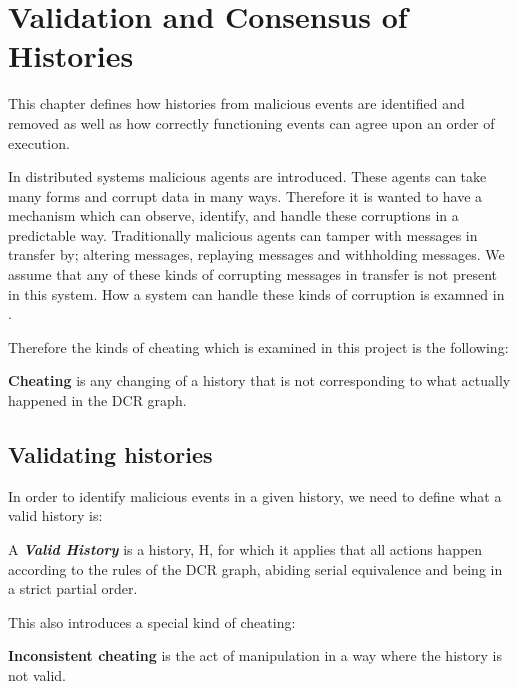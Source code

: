 \chapter{Validation and Consensus of Histories}
\label{chap:consensusindcr}
	This chapter defines how histories from malicious events are identified and removed as well as how correctly functioning events can agree upon an order of execution.
	
	\newpar In distributed systems malicious agents are introduced. These agents can take many forms and corrupt data in many ways. Therefore it is wanted to have a mechanism which can observe, identify, and handle these corruptions in a predictable way. Traditionally malicious agents can tamper with messages in transfer by; altering messages, replaying messages and withholding messages. We assume that any of these kinds of corrupting messages in transfer is not present in this system. How a system can handle these kinds of corruption is examned in .
	
	\newpar Therefore the kinds of cheating which is examined in this project is the following:
	\begin{definition}
		\textbf{Cheating} is any changing of a history that is not corresponding to what actually happened in the DCR graph.
	\end{definition}
	
	\section{Validating histories}
	In order to identify malicious events in a given history, we need to define what a valid history is:
	
		\begin{definition}
			A \textit{\textbf{Valid History}} is a history, H, for which it applies that all actions happen according to the rules of the DCR graph, abiding serial equivalence and being in a strict partial order. 
		\end{definition}
		
	This also introduces a special kind of cheating:
	
		\begin{definition}
			\textbf{Inconsistent cheating} is the act of manipulation  in a way where the history is not valid.
		\end{definition}
		
